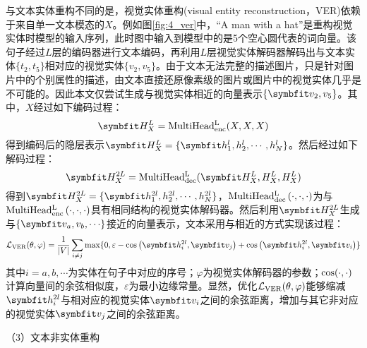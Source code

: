 
与文本实体重构不同的是，视觉实体重构(visual entity reconstruction，VER)依赖于来自单一文本模态的$X$。例如图\ref{fig:4_ver}中，“A man with a hat”是重构视觉实体时模型的输入序列，此时图中输入到模型中的是5个空心圆代表的词向量。该句子经过$L$层的编码器进行文本编码，再利用$L$层视觉实体解码器解码出与文本实体$\{t_2,t_5\}$相对应的视觉实体$\{v_2,v_5\}$。由于文本无法完整的描述图片，只是针对图片中的个别属性的描述，由文本直接还原像素级的图片或图片中的视觉实体几乎是不可能的。因此本文仅尝试生成与视觉实体相近的向量表示$\{\Vector{v_2,v_5}\}$。其中，$X$经过如下编码过程：
\begin{equation}
\Vector{H_X^L}={\rm{MultiHead_{enc}^L}}(X, X, X)
\end{equation}
得到编码后的隐层表示$\Vector{H_X^L}=\{\Vector{h_1^l,h_2^l,\cdots,h_N^l}\}$。然后经过如下解码过程：
\begin{equation}
\Vector{H_X^{2L}}={\rm{MultiHead_{dec}^L}}(\Vector{H_X^L, H_X^L, H_X^L})
\end{equation}
得到$\Vector{H_X^{2L}}=\{\Vector{h_1^{2l},h_2^{2l},\cdots,h_N^{2l}}\}$，${\rm MultiHead_{dec}^L}\left( \cdot,\cdot,\cdot \right)$为与${\rm MultiHead_{enc}^L}\left( \cdot,\cdot,\cdot \right)$具有相同结构的视觉实体解码器。然后利用$\Vector{H_X^{2L}}$生成与$\{\Vector{v_a,v_b,\cdots}\}$接近的向量表示，文本采用与相近的方式实现该过程：
\begin{equation}
\mathcal{L}_{\rm{VER}}(\theta, \varphi)=
    \frac{1}{{\vert}V{\vert}}
    \mathop{\sum}_{i \neq j}{\max}\{0, \varepsilon - {\rm{cos}}\left( \Vector{h_i^{2l}}, \Vector{v_j} \right) + {\rm{cos}}\left( \Vector{h_i^{2l}}, \Vector{v_i} \right)\}
\end{equation}
%
其中$i=a,b,\cdots$为实体在句子中对应的序号；$\varphi$为视觉实体解码器的参数；${\rm{cos}}(\cdot,\cdot)$计算向量间的余弦相似度，$\varepsilon$为最小边缘常量。显然，优化$\mathcal{L}_{\rm{VER}}(\theta,\varphi)$能够缩减$\Vector{h_i^{2l}}$与相对应的视觉实体$\Vector{v_i}$之间的余弦距离，增加与其它非对应的视觉实体$\Vector{v_j}$之间的余弦距离。

{\sffamily （3）文本非实体重构}

